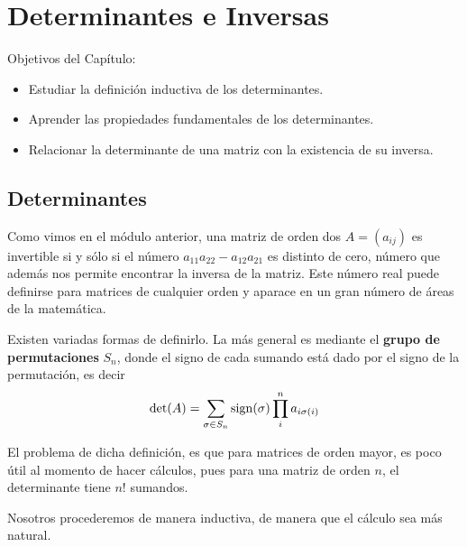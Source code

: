 \section{Determinantes e Inversas}

Objetivos del Capítulo:

\begin{itemize}
\item
Estudiar la definición inductiva de los determinantes.

\item
Aprender las propiedades fundamentales de los determinantes.

\item
Relacionar la determinante de una matriz con la existencia de su inversa.

\end{itemize}

\subsection{Determinantes}
Como vimos en el m\'odulo anterior, una matriz de orden dos $A=(a_{ij})$ es invertible si y s\'olo si el n\'umero $a_{11}a_{22}-a_{12}a_{21}$ es distinto de cero, n\'umero que adem\'as nos permite encontrar la inversa de la matriz. Este n\'umero real puede definirse para matrices de cualquier orden y aparace en un gran n\'umero de \'areas de la matem\'atica.

Existen variadas formas de definirlo. La m\'as general es mediante el \textbf{grupo de permutaciones} $S_n$, donde el signo de cada sumando est\'a dado por el signo de la permutaci\'on, es decir
\[\det(A)=\sum_{\sigma \in S_n}\operatorname{sign}(\sigma) \prod_i^n a_{i\sigma(i)}\]


El problema de dicha definici\'on, es que para matrices de orden mayor, es poco \'util al momento de hacer c\'alculos, pues para una matriz de orden $n$, el determinante tiene $n!$ sumandos.

Nosotros procederemos de manera inductiva, de manera que el c\'alculo sea m\'as natural.

